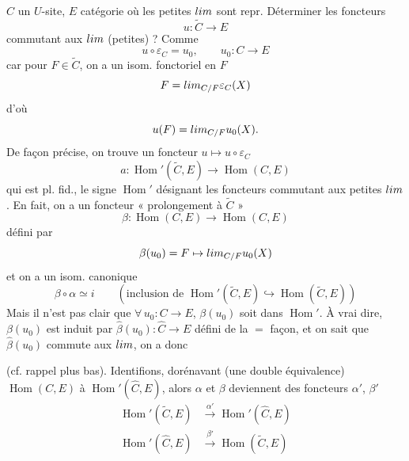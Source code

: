 \documentclass[11pt,a4paper]{article}
\begin{document}
$C$ un $U$-site, $E$ catégorie où les petites $\varinjlim$ sont repr.
Déterminer les foncteurs
\[
u : \widetilde{C} \longrightarrow E
\]
commutant aux $\varinjlim$ (petites) ? Comme \ill{}
\[
u \circ \varepsilon_{C} = u_{0} , \qquad u_{0} : C \longrightarrow E
\]
car pour $F \in \widetilde{C}$, on a un isom. fonctoriel en $F$
\[
F = \varinjlim_{C/F} \varepsilon_{C}(X)
\]
d'où
\[
u(F) = \varinjlim_{C/F} u_{0}(X) .
\]
De façon précise, on trouve un foncteur $u \mapsto u \circ \varepsilon_{C}$
\[
a : \operatorname{Hom}'(\widetilde{C}, E) \longrightarrow \operatorname{Hom}(C,E)
\]
qui est pl. fid., le signe $\operatorname{Hom}'$ désignant les foncteurs
commutant aux petites $\varinjlim$. En fait, on a un foncteur
« prolongement à $\widetilde{C}$ »
\[
\beta : \operatorname{Hom}(C,E) \longrightarrow \operatorname{Hom}(C,E)
\]
défini par
\[
\beta(u_{0}) = F \mapsto \varinjlim_{C/F} u_{0}(X)
\]
et on a un isom. canonique
\[
\beta \circ \alpha \simeq i
\qquad (\text{inclusion de } \operatorname{Hom}'(\widetilde{C},E)
\hookrightarrow \operatorname{Hom}(\widetilde{C},E))
\]
Mais il n'est pas clair que $\forall\, u_{0} : C \to E$, $\beta(u_{0})$ soit
dans $\operatorname{Hom}'$. À vrai dire, $\beta(u_{0})$ est induit par
$\widehat{\beta}(u_{0}) : \widehat{C} \to E$ défini de la $=$ façon, et on sait
que $\widehat{\beta}(u_{0})$ commute aux $\varinjlim$, on a donc


(cf. rappel plus bas). Identifions, dorénavant (une double équivalence)
$\operatorname{Hom}(C,E)$ à $\operatorname{Hom}'(\widehat{C},E)$, alors
$\alpha$ et $\beta$ deviennent des foncteurs $\alpha'$, $\beta'$
\begin{align}
\operatorname{Hom}'(\widetilde{C}, E) &\xrightarrow{\ \alpha'\ } \operatorname{Hom}'(\widehat{C}, E) \nonumber\\
\operatorname{Hom}'(\widehat{C}, E) &\xrightarrow{\ \beta'\ } \operatorname{Hom}(\widetilde{C}, E) \nonumber
\end{align}
\end{document}

